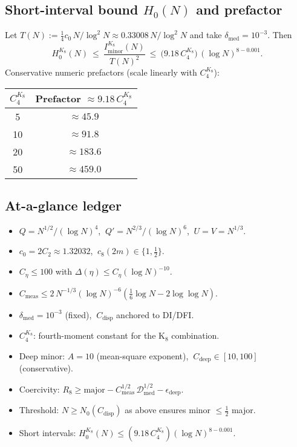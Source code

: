\documentclass[11pt]{article}
\theoremstyle{definition}
\theoremstyle{remark}
\begin{document}
\subsection*{Short-interval bound $H_0(N)$ and prefactor}
Let $T(N):=\tfrac14 c_0\,N/\log^2 N\approx 0.33008\,N/\log^2N$ and take $\delta_{\mathrm{med}}=10^{-3}$. Then
\[
  H_0^{K_8}(N)\ \le\ \frac{I_{\mathrm{minor}}^{K_8}(N)}{T(N)^2}\ \le\ \big(9.18\,C_4^{K_8}\big)\,(\log N)^{8-0.001}.
\]
Conservative numeric prefactors (scale linearly with $C_4^{K_8}$):
\begin{center}
\begin{tabular}{c|c}
$C_4^{K_8}$ & Prefactor $\approx 9.18\,C_4^{K_8}$ \\
\hline
5 & $\approx 45.9$ \\
10 & $\approx 91.8$ \\
20 & $\approx 183.6$ \\
50 & $\approx 459.0$ \\
\end{tabular}
\end{center}

\subsection*{At-a-glance ledger}
\begin{itemize}
  \item $Q=N^{1/2}/(\log N)^4$, $\ Q'=N^{2/3}/(\log N)^6$, $\ U=V=N^{1/3}$.
  \item $c_0=2C_2\approx 1.32032$, $\ c_8(2m)\in\{1,\tfrac12\}$.
  \item $C_{\eta}\le 100$ with $\Delta(\eta)\le C_{\eta}(\log N)^{-10}$.
  \item $C_{\mathrm{meas}}\le 2\,N^{-1/3}(\log N)^{-6}(\tfrac16\log N-2\log\log N)$.
  \item $\delta_{\mathrm{med}}=10^{-3}$ (fixed), $\ C_{\mathrm{disp}}$ anchored to DI/DFI.
  \item $C_4^{K_8}$: fourth-moment constant for the K$_8$ combination.
  \item Deep minor: $A=10$ (mean-square exponent), $\ C_{\mathrm{deep}}\in[10,100]$ (conservative).
  \item Coercivity: $R_8\ge \text{major}-C_{\mathrm{meas}}^{1/2}\,\mathcal D_{\mathrm{med}}^{1/2}-\epsilon_{\mathrm{deep}}$.
  \item Threshold: $N\ge N_0(C_{\mathrm{disp}})$ as above ensures minor $\le \tfrac12$ major.
  \item Short intervals: $H_0^{K_8}(N)\le (9.18\,C_4^{K_8})(\log N)^{8-0.001}$.
\end{itemize}
\end{document}
